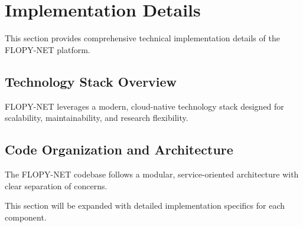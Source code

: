 \section{Implementation Details}
\label{sec:implementation-details}

This section provides comprehensive technical implementation details of the FLOPY-NET platform.

\subsection{Technology Stack Overview}

FLOPY-NET leverages a modern, cloud-native technology stack designed for scalability, maintainability, and research flexibility.

\subsection{Code Organization and Architecture}

The FLOPY-NET codebase follows a modular, service-oriented architecture with clear separation of concerns.

This section will be expanded with detailed implementation specifics for each component.
